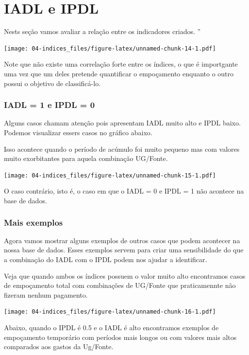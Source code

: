\documentclass[
]{book}
\begin{document}
\hypertarget{iadl-e-ipdl}{%
\section{IADL e IPDL}\label{iadl-e-ipdl}}

Nests seção vamos avaliar a relação entre os indicadores criados. ''

\texttt{[image: 04-indices\_files/figure-latex/unnamed-chunk-14-1.pdf]}

Note que não existe uma correlação forte entre os índices, o que é importgante uma vez que um deles pretende quantificar o empoçamento enquanto o outro possui o objetivo de classificá-lo.

\hypertarget{iadl-1-e-ipdl-0}{%
\subsubsection{IADL = 1 e IPDL = 0}\label{iadl-1-e-ipdl-0}}

Alguns casos chamam atenção pois apresentam IADL muito alto e IPDL baixo.
Podemos visualizar essers casos no gráfico abaixo.

Isso acontece quando o período de acúmulo foi muito pequeno mas com
valores muito exorbitantes para aquela combinação UG/Fonte.

\texttt{[image: 04-indices\_files/figure-latex/unnamed-chunk-15-1.pdf]}

O caso contrário, isto é, o caso em que o IADL = 0 e IPDL = 1 não acontece na base de dados.

\hypertarget{mais-exemplos-2}{%
\subsubsection{Mais exemplos}\label{mais-exemplos-2}}

Agora vamos mostrar alguns exemplos de outros casos que podem acontecer na nossa base de dados. Esses exemplos servem para criar uma sensibilidade do que a combinação do IADL com o IPDL podem nos ajudar a identificar.

Veja que quando ambos os índices possuem o valor muito alto encontramos casos de empoçamento total com combinações de UG/Fonte que praticamennte não fizeram nenhum pagamento.

\texttt{[image: 04-indices\_files/figure-latex/unnamed-chunk-16-1.pdf]}

Abaixo, quando o IPDL é 0.5 e o IADL é alto encontramos exemplos de empoçamento temporário com períodos mais longos ou com valores mais altos comparados aos gastos da Ug/Fonte.
\end{document}
